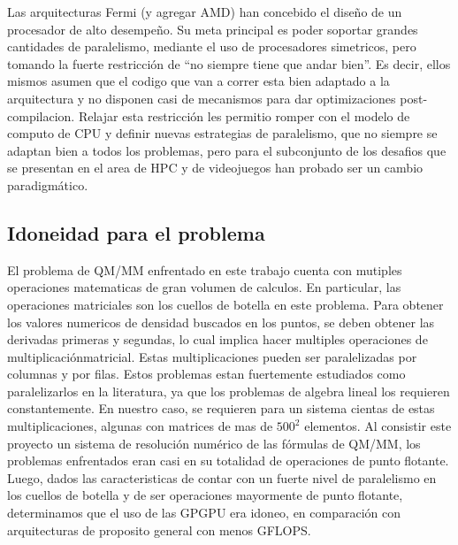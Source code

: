 Las arquitecturas Fermi (y agregar AMD) han concebido el dise\~no de un procesador de alto desempe\~no.
Su meta principal es poder soportar grandes cantidades de paralelismo, mediante el uso de procesadores
simetricos, pero tomando la fuerte restricci\'on de ``no siempre tiene que andar bien''. Es decir, ellos
mismos asumen que el codigo que van a correr esta bien adaptado a la arquitectura y no disponen
casi de mecanismos para dar optimizaciones post-compilacion. Relajar esta restricci\'on
les permitio romper con el modelo de computo de CPU y definir nuevas estrategias de paralelismo,
que no siempre se adaptan bien a todos los problemas, pero para el subconjunto de los desafios que se
presentan en el area de HPC y de videojuegos han probado ser un cambio paradigm\'atico.

\subsection{Idoneidad para el problema}
El problema de QM/MM enfrentado en este trabajo cuenta con mutiples operaciones matematicas de gran
volumen de calculos. En particular, las operaciones matriciales son los cuellos de botella en este
problema.
Para obtener los valores numericos de densidad buscados en los puntos, se deben obtener las derivadas primeras
y segundas, lo cual implica hacer multiples operaciones de multiplicaci\'onmatricial. Estas multiplicaciones
pueden ser paralelizadas por columnas y por filas. Estos problemas estan fuertemente estudiados como paralelizarlos
en la literatura, ya que los problemas de algebra lineal los requieren constantemente.
En nuestro caso, se requieren para un sistema cientas de estas multiplicaciones, algunas con matrices de mas de
$500^2$ elementos. Al consistir este proyecto un sistema de resoluci\'on num\'erico de las f\'ormulas de QM/MM,
los problemas enfrentados eran casi en su totalidad de operaciones de punto flotante. Luego, dados las
caracteristicas de contar con un fuerte nivel de paralelismo en los cuellos de botella y de ser operaciones
mayormente de punto flotante, determinamos que el uso de las GPGPU era idoneo, en comparaci\'on con arquitecturas
de proposito general con menos GFLOPS.

